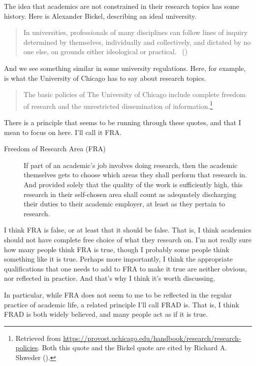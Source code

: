 \documentclass[
  11pt,
  letterpaper,
  DIV=11,
  numbers=noendperiod]{scrartcl}
\begin{document}
The idea that academics are not constrained in their research topics has
some history. Here is Alexander Bickel, describing an ideal university.

\begin{quote}
In universities, professionals of many disciplines can follow lines of
inquiry determined by themselves, individually and collectively, and
dictated by no one else, on grounds either ideological or practical.
~()
\end{quote}

And we see something similar in some university regulations. Here, for
example, is what the University of Chicago has to say about research
topics.

\begin{quote}
The basic policies of The University of Chicago include complete freedom
of research and the unrestricted dissemination of
information.\footnote{Retrieved from
  \url{https://provost.uchicago.edu/handbook/research/research-policies}.
  Both this quote and the Bickel quote are cited by Richard A. Shweder
  ().}
\end{quote}

There is a principle that seems to be running through these quotes, and
that I mean to focus on here. I'll call it FRA.

\begin{description}
\item[Freedom of Research Area (FRA)]
If part of an academic's job involves doing research, then the academic
themselves gets to choose which areas they shall perform that research
in. And provided solely that the quality of the work is sufficiently
high, this research in their self-chosen area shall count as adequately
discharging their duties to their academic employer, at least as they
pertain to research.
\end{description}

I think FRA is false, or at least that it should be false. That is, I
think academics should not have complete free choice of what they
research on. I'm not really sure how many people think FRA is true,
though I probably some people think something like it is true. Perhaps
more importantly, I think the appropriate qualifications that one needs
to add to FRA to make it true are neither obvious, nor reflected in
practice. And that's why I think it's worth discussing.

In particular, while FRA does not seem to me to be reflected in the
regular practice of academic life, a related principle I'll call FRAD
is. That is, I think FRAD is both widely believed, and many people act
as if it is true.
\end{document}

